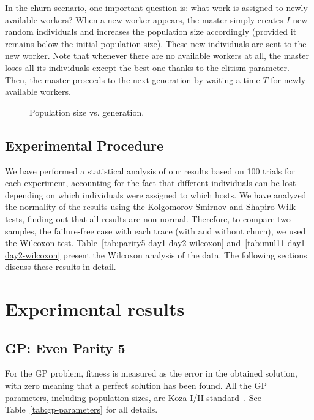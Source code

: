 \documentclass[graybox]{sty/svmult}
\begin{document}
In the churn scenario, one important question is: what work is assigned
to newly available workers? When a new worker appears, the master
simply creates $I$ new random individuals and increases the population
size accordingly (provided it remains below the initial population size). 
These new individuals are sent to the new worker. Note that whenever there are 
no available workers at all, the master loses all its individuals except the 
best one thanks to the elitism parameter. Then, the master proceeds to the 
next generation by waiting a time  $T$ for newly available workers.

\begin{figure}
    \begin{center}
    \end{center}
    \caption{\label{fig:population-length}Population size vs. generation.}
\end{figure}

\subsection{Experimental Procedure}
\label{experiments-results}

We have performed a statistical analysis of our results based
on 100 trials for each experiment, accounting for the fact that
different individuals can be lost depending on which individuals were
assigned to which hosts.  We have analyzed the normality
of the results using the Kolgomorov-Smirnov and Shapiro-Wilk tests,
finding out that all results are non-normal. Therefore, to compare two
samples, the failure-free case with each trace (with and without churn),
we used the Wilcoxon test. Table~\ref{tab:parity5-day1-day2-wilcoxon}
and~\ref{tab:mul11-day1-day2-wilcoxon} present the Wilcoxon analysis of
the data. The following sections discuss these results in detail.

\section{Experimental results}
\label{experimentalresults}

\subsection{GP: Even Parity 5}

For the GP problem, fitness is measured as the error in the obtained solution, with zero meaning that a perfect solution has
been found. All the GP parameters, including population sizes, are
Koza-I/II standard~\cite{koza:book}.  See Table~\ref{tab:gp-parameters}
for all details.
\end{document}
